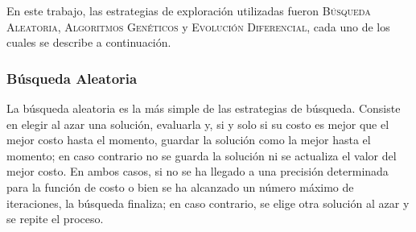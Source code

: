 %
%
%
%

En este trabajo, las estrategias de exploración utilizadas fueron \textsc{Búsqueda Aleatoria}, \textsc{Algoritmos Genéticos} y \textsc{Evolución Diferencial}, cada uno de los cuales se describe a continuación.

\subsubsection{Búsqueda Aleatoria}

La búsqueda aleatoria es la más simple de las estrategias de búsqueda. Consiste en elegir al azar una solución, evaluarla y, si y solo si su costo es mejor que el mejor costo hasta el momento, guardar la solución como la mejor hasta el momento; en caso contrario no se guarda la solución ni se actualiza el valor del mejor costo. En ambos casos, si no se ha llegado a una precisión determinada para la función de costo o bien se ha alcanzado un número máximo de iteraciones, la búsqueda finaliza; en caso contrario, se elige otra solución al azar y se repite el proceso.

